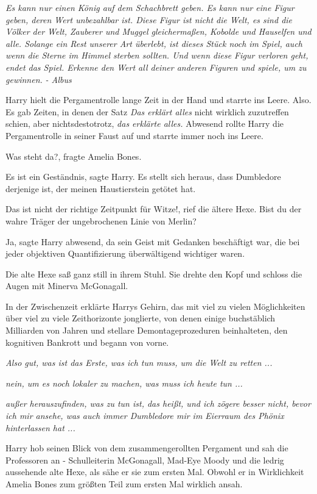 \emph{Es kann nur einen König auf dem Schachbrett geben. Es kann nur eine Figur
geben, deren Wert unbezahlbar ist. Diese Figur ist nicht die Welt, es sind die
Völker der Welt, Zauberer und Muggel gleichermaßen, Kobolde und Hauselfen und
alle. Solange ein Rest unserer Art überlebt, ist dieses Stück noch im Spiel,
auch wenn die Sterne im Himmel sterben sollten. Und wenn diese Figur verloren
geht, endet das Spiel. Erkenne den Wert all deiner anderen Figuren und spiele,
um zu gewinnen.}
\emph{- Albus}

Harry hielt die Pergamentrolle lange Zeit in der Hand und starrte ins Leere.
Also. Es gab Zeiten, in denen der Satz \emph{\glqq{}Das erklärt alles\grqq{}}
nicht wirklich zuzutreffen schien, aber nichtsdestotrotz, \emph{das erklärte
alles.} Abwesend rollte Harry die Pergamentrolle in seiner Faust auf und starrte
immer noch ins Leere.

\glqq{}Was steht da?\grqq{}, fragte Amelia Bones.

\glqq{}Es ist ein Geständnis\grqq{}, sagte Harry. \glqq{}Es stellt sich heraus,
dass Dumbledore derjenige ist, der meinen Haustierstein getötet hat.\grqq{}

\glqq{}Das ist nicht der richtige Zeitpunkt für Witze!\grqq{}, rief die ältere
Hexe. \glqq{}Bist du der wahre Träger der ungebrochenen Linie von Merlin?\grqq{}

\glqq{}Ja\grqq{}, sagte Harry abwesend, da sein Geist mit Gedanken beschäftigt
war, die bei jeder objektiven Quantifizierung überwältigend wichtiger waren.

Die alte Hexe saß ganz still in ihrem Stuhl. Sie drehte den Kopf und schloss die
Augen mit Minerva McGonagall.

In der Zwischenzeit erklärte Harrys Gehirn, das mit viel zu vielen Möglichkeiten
über viel zu viele Zeithorizonte jonglierte, von denen einige buchstäblich
Milliarden von Jahren und stellare Demontageprozeduren beinhalteten, den
kognitiven Bankrott und begann von vorne.

\emph{Also gut, was ist das Erste, was ich tun muss, um die Welt zu retten ...}

\emph{nein, um es noch lokaler zu machen, was muss ich heute tun ...}

\emph{außer herauszufinden, was zu tun ist, das heißt, und ich zögere besser
nicht, bevor ich mir ansehe, was auch immer Dumbledore mir im Eierraum des
Phönix hinterlassen hat ...}

Harry hob seinen Blick von dem zusammengerollten Pergament und sah die
Professoren an - Schulleiterin McGonagall, Mad-Eye Moody und die ledrig
aussehende alte Hexe, als sähe er sie zum ersten Mal. Obwohl er in Wirklichkeit
Amelia Bones zum größten Teil zum ersten Mal wirklich ansah.

